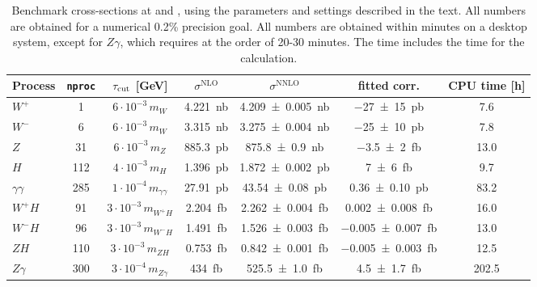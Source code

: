 \begin{table}[]
	\caption{Benchmark cross-sections at \NLO{} and \NNLO{}, using the parameters
		and settings described in the text. All numbers are obtained for a numerical 0.2\% precision goal.
	All \NLO{} numbers are obtained within minutes on a desktop system, except for $Z\gamma$, which requires at the 
	order of 20-30 minutes. The \NNLO{} \CPU{} time includes the time for the \NLO{} calculation.}
	\vspace{0.5em}
	\begin{tabular}{@{}lcccccc@{}}
		\toprule
		Process & \texttt{nproc} & $\tau_\text{cut}$ [GeV] & $\sigma^\text{NLO}$ & 
		$\sigma^\text{NNLO}$ & fitted corr. & CPU time [h] \\ \midrule 
		$W^+$ &  1 &   $6\cdot10^{-3}\, m_W$  &  \SI{4.221}{nb} & \SI{4.209\pm0.005}{nb} & \SI{-27\pm15}{pb}  & 7.6 
		\\           
		$W^-$ &  6 &   $6\cdot10^{-3}\, m_W$ & \SI{3.315}{nb} & \SI{3.275\pm0.004}{nb} & \SI{-25\pm10}{pb} & 7.8 \\
		$Z$   &  31 &   $6\cdot10^{-3}\, m_Z$ & \SI{885.3}{pb} & \SI{875.8\pm0.9}{nb} & \SI{-3.5\pm 2}{fb} & 13.0 \\
		$H$   &  112 &   $4\cdot10^{-3}\, m_H$ & \SI{1.396}{pb} & \SI{1.872\pm0.002}{pb} & \SI{7\pm6}{fb} & 9.7 \\
		$\gamma\gamma$   &  285 &   $1\cdot10^{-4}\, m_{\gamma\gamma}$ & \SI{27.91}{pb} & \SI{43.54\pm0.08}{pb} & 
		\SI{0.36\pm0.10}{pb} & 83.2 \\
		$W^+ H$   &  91 &   $3\cdot10^{-3}\, m_{W^+ H}$ & \SI{2.204}{fb} & \SI{2.262\pm0.004}{fb} & 
		\SI{0.002\pm0.008}{fb} & 16.0 \\
		$W^- H$   &  96 &   $3\cdot10^{-3}\, m_{W^- H}$ & \SI{1.491}{fb} & \SI{1.526\pm0.003}{fb} & 
		\SI{-0.005\pm0.007}{fb} & 13.0 \\
		$Z H$   &  110 &   $3\cdot10^{-3}\, m_{Z H}$ & \SI{0.753}{fb} & \SI{0.842\pm0.001}{fb} & 
		\SI{-0.005\pm0.003}{fb} & 12.5 \\
		$Z \gamma$   &  300 &   $3\cdot10^{-4}\, m_{Z \gamma}$ & \SI{434}{fb} & \SI{525.5\pm1.0}{fb} & 
		\SI{4.5\pm1.7}{fb} & 202.5 \\
	 \bottomrule
	\end{tabular}
\end{table}

